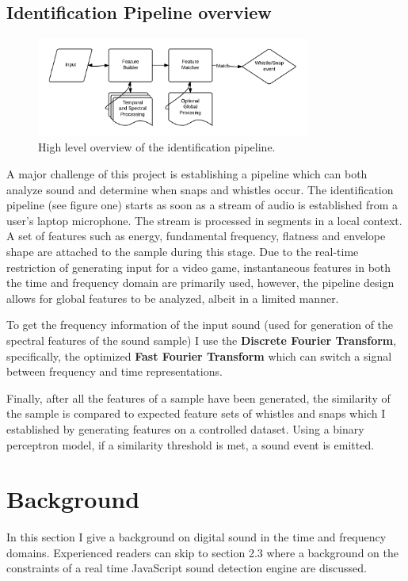 \documentclass[DIV=calc, paper=a4, fontsize=11pt, twocolumn]{scrartcl}   %
\begin{document}
\subsection{Identification Pipeline overview}
\begin{figure}[h]
\centering
\includegraphics[width=90mm]{figures/HighLevelPipeline.png}
\caption{High level overview of the identification pipeline.}
\label{overflow}
\end{figure}
A major challenge of this project is establishing a pipeline which can both analyze sound and determine when snaps and whistles occur. The identification pipeline (see figure one) starts as soon as a stream of audio is established from a user's laptop microphone. The stream is processed in segments in a local context. A set of features such as energy, fundamental frequency, flatness and envelope shape are attached to the sample during this stage. Due to the real-time restriction of generating input for a video game, instantaneous features in both the time and frequency domain are primarily used, however, the pipeline design allows for global features to be analyzed, albeit in a limited manner.
\par To get the frequency information of the input sound (used for generation of the spectral features of the sound sample) I use the \textbf{Discrete Fourier Transform}, specifically, the optimized \textbf{Fast Fourier Transform}  which can switch a signal between frequency and time representations.
\par Finally, after all the features of a sample have been generated, the similarity of the sample is compared to expected feature sets of whistles and snaps which I established by generating features on a controlled dataset. Using a binary perceptron model, if a similarity threshold is met, a sound event is emitted.





\section{Background}
In this section I give a background on digital sound in the time and frequency domains. Experienced readers can skip to section 2.3 where a background on the constraints of a real time JavaScript sound detection engine are discussed.
\end{document}
